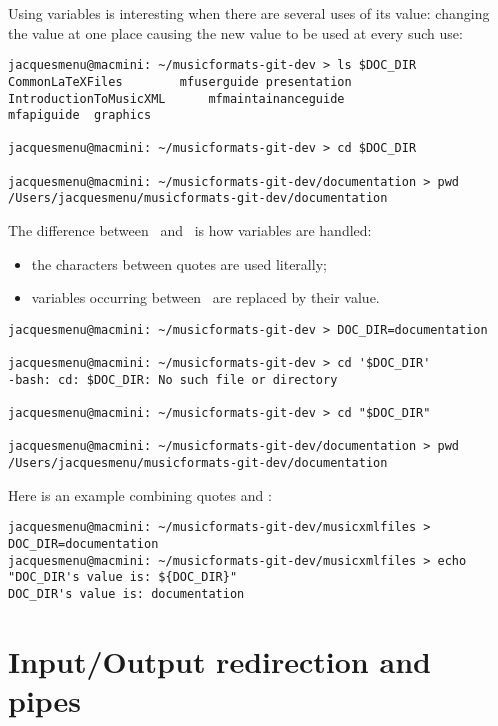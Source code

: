 Using variables is interesting when there are several uses of its value: changing the value at one place causing the new value to be used at every such use:
\begin{lstlisting}[language=Terminal]
jacquesmenu@macmini: ~/musicformats-git-dev > ls $DOC_DIR
CommonLaTeXFiles		mfuserguide	presentation
IntroductionToMusicXML		mfmaintainanceguide
mfapiguide	graphics

jacquesmenu@macmini: ~/musicformats-git-dev > cd $DOC_DIR

jacquesmenu@macmini: ~/musicformats-git-dev/documentation > pwd
/Users/jacquesmenu/musicformats-git-dev/documentation
\end{lstlisting}

The difference between \quotes\ and \doubleQuotes\ is how variables are handled:
\begin{itemize}
\item the characters between quotes are used literally;
\item variables occurring between \doubleQuotes\ are replaced by their value.
\end{itemize}

\begin{lstlisting}[language=Terminal]
jacquesmenu@macmini: ~/musicformats-git-dev > DOC_DIR=documentation

jacquesmenu@macmini: ~/musicformats-git-dev > cd '$DOC_DIR'
-bash: cd: $DOC_DIR: No such file or directory

jacquesmenu@macmini: ~/musicformats-git-dev > cd "$DOC_DIR"

jacquesmenu@macmini: ~/musicformats-git-dev/documentation > pwd
/Users/jacquesmenu/musicformats-git-dev/documentation
\end{lstlisting}

Here is an example combining quotes and \doubleQuotes:
\begin{lstlisting}[language=Terminal]
jacquesmenu@macmini: ~/musicformats-git-dev/musicxmlfiles > DOC_DIR=documentation
jacquesmenu@macmini: ~/musicformats-git-dev/musicxmlfiles > echo "DOC_DIR's value is: ${DOC_DIR}"
DOC_DIR's value is: documentation
\end{lstlisting}


\section{Input/Output redirection and pipes}

